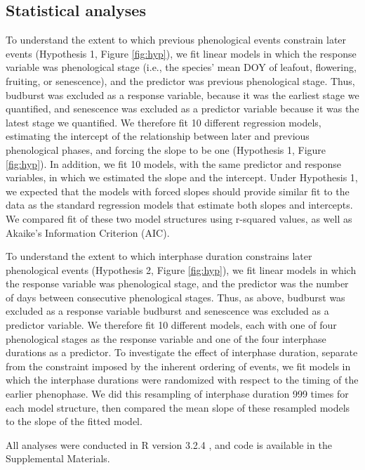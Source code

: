 \documentclass{article}
\begin{document}
\subsection*{Statistical analyses}
To understand the extent to which previous phenological events constrain later events (Hypothesis 1, Figure \ref{fig:hyp}), we fit linear models in which the response variable was phenological stage (i.e., the species' mean DOY of leafout, flowering, fruiting, or senescence), and the predictor was previous phenological stage. Thus, budburst was excluded as a response variable, because it was the earliest stage we quantified, and senescence was excluded as a predictor variable because it was the latest stage we quantified.  We therefore fit 10 different regression models, estimating the intercept of the relationship between later and previous phenological phases, and forcing the slope to be one (Hypothesis 1, Figure \ref{fig:hyp}). In addition, we fit 10 models, with the same predictor and response variables, in which we estimated the slope and the intercept. Under Hypothesis 1, we expected that the models with forced slopes should provide similar fit to the data as the standard regression models that estimate both slopes and intercepts. We compared fit of these two model structures using r-squared values, as well as Akaike's Information Criterion (AIC).  
\par To understand the extent to which interphase duration constrains later phenological events (Hypothesis 2, Figure \ref{fig:hyp}), we fit linear models in which the response variable was phenological stage, and the predictor was the number of days between consecutive phenological stages. Thus, as above, budburst was excluded as a response variable budburst and senescence was excluded as a predictor variable. We therefore fit 10 different models, each with one of four phenological stages as the response variable and one of the four interphase durations as a predictor. To investigate the effect of interphase duration, separate from the constraint imposed by the inherent ordering of events, we fit models in which the interphase durations were randomized with respect to the timing of the earlier phenophase. We did this resampling of interphase duration 999 times for each model structure, then compared the mean slope of these resampled models to the slope of the fitted model.  
\par All analyses were conducted in R version 3.2.4 \citep{rcoreteam2016}, and code is available in the Supplemental Materials.
\end{document}
